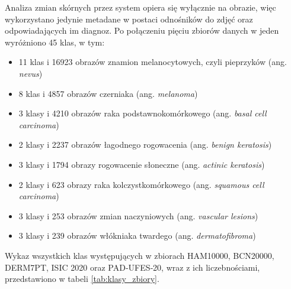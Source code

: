Analiza zmian skórnych przez system opiera się wyłącznie na obrazie, więc wykorzystano jedynie metadane w postaci odnośników do zdjęć oraz odpowiadających im diagnoz.
Po połączeniu pięciu zbiorów danych w jeden wyróżniono 45 klas, w tym:

\begin{itemize}
	\item 11 klas i 16923 obrazów znamion melanocytowych, czyli pieprzyków (ang. \textit{nevus})
	\item 8 klas i 4857 obrazów czerniaka (ang. \textit{melanoma})
	\item 3 klasy i 4210 obrazów raka podstawnokomórkowego (ang. \textit{basal cell carcinoma})
	\item 2 klasy i 2237 obrazów łagodnego rogowacenia (ang. \textit{benign keratosis})
	\item 3 klasy i 1794 obrazy rogowacenie słoneczne (ang. \textit{actinic keratosis})
	\item 2 klasy i 623 obrazy raka kolczystkomórkowego  (ang. \textit{squamous cell carcinoma})
	\item 3 klasy i 253 obrazów zmian naczyniowych (ang. \textit{vascular lesions})
	\item 3 klasy i 239 obrazów włókniaka twardego (ang. \textit{dermatofibroma})
\end{itemize}

Wykaz wszystkich klas występujących w zbiorach HAM10000, BCN20000, DERM7PT, ISIC 2020 oraz PAD‑UFES‑20, wraz z ich liczebnościami, przedstawiono w tabeli \ref{tab:klasy_zbiory}.

